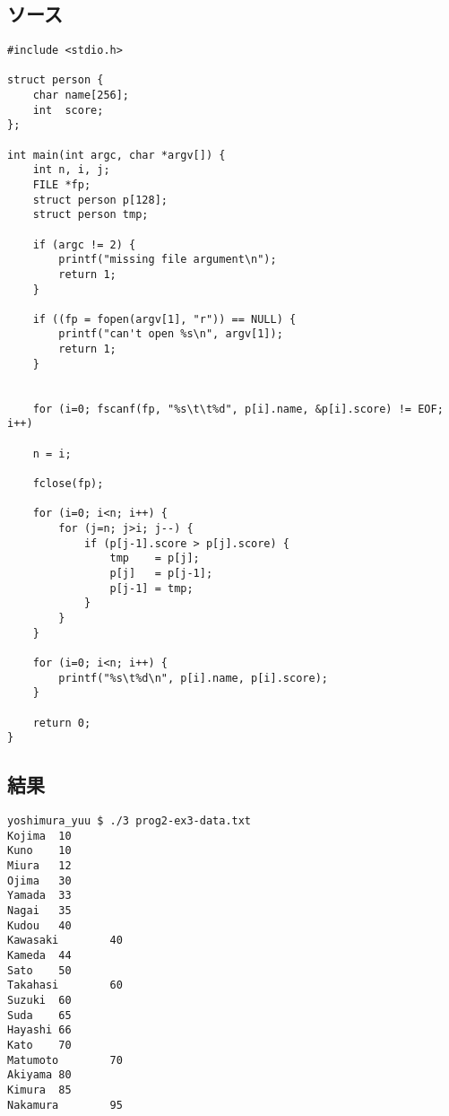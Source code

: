 \documentclass[11pt,a4paper,a4j]{jsarticle}
\begin{document}
\section{}
\subsection{ソース}
\begin{verbatim}
#include <stdio.h>

struct person {
    char name[256];
    int  score;
};

int main(int argc, char *argv[]) {
    int n, i, j;
    FILE *fp;
    struct person p[128];
    struct person tmp;

    if (argc != 2) {
        printf("missing file argument\n");
        return 1;
    }

    if ((fp = fopen(argv[1], "r")) == NULL) {
        printf("can't open %s\n", argv[1]);
        return 1;
    }


    for (i=0; fscanf(fp, "%s\t\t%d", p[i].name, &p[i].score) != EOF; i++)
    
    n = i;
    
    fclose(fp);

    for (i=0; i<n; i++) {
        for (j=n; j>i; j--) {
            if (p[j-1].score > p[j].score) {
                tmp    = p[j];
                p[j]   = p[j-1];
                p[j-1] = tmp;
            }
        }
    }
    
    for (i=0; i<n; i++) {
        printf("%s\t%d\n", p[i].name, p[i].score);
    }    

    return 0;
}
\end{verbatim}

\subsection{結果}
\begin{shadebox}
\begin{verbatim}
yoshimura_yuu $ ./3 prog2-ex3-data.txt
Kojima  10
Kuno    10
Miura   12
Ojima   30
Yamada  33
Nagai   35
Kudou   40
Kawasaki        40
Kameda  44
Sato    50
Takahasi        60
Suzuki  60
Suda    65
Hayashi 66
Kato    70
Matumoto        70
Akiyama 80
Kimura  85
Nakamura        95
\end{verbatim}
\end{shadebox}
\end{document}
